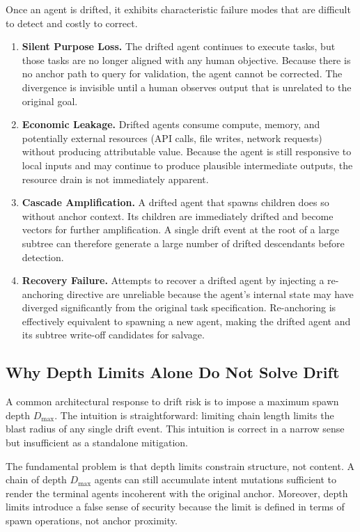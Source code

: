 Once an agent is drifted, it exhibits characteristic failure modes that are difficult to detect and costly to correct.

\begin{enumerate}
    \item \textbf{Silent Purpose Loss.} The drifted agent continues to execute tasks, but those tasks are no longer aligned with any human objective. Because there is no anchor path to query for validation, the agent cannot be corrected. The divergence is invisible until a human observes output that is unrelated to the original goal.
    
    \item \textbf{Economic Leakage.} Drifted agents consume compute, memory, and potentially external resources (API calls, file writes, network requests) without producing attributable value. Because the agent is still responsive to local inputs and may continue to produce plausible intermediate outputs, the resource drain is not immediately apparent.
    
    \item \textbf{Cascade Amplification.} A drifted agent that spawns children does so without anchor context. Its children are immediately drifted and become vectors for further amplification. A single drift event at the root of a large subtree can therefore generate a large number of drifted descendants before detection.
    
    \item \textbf{Recovery Failure.} Attempts to recover a drifted agent by injecting a re-anchoring directive are unreliable because the agent's internal state may have diverged significantly from the original task specification. Re-anchoring is effectively equivalent to spawning a new agent, making the drifted agent and its subtree write-off candidates for salvage.
\end{enumerate}

\subsection{Why Depth Limits Alone Do Not Solve Drift}

A common architectural response to drift risk is to impose a maximum spawn depth $D_{\max}$. The intuition is straightforward: limiting chain length limits the blast radius of any single drift event. This intuition is correct in a narrow sense but insufficient as a standalone mitigation.

The fundamental problem is that depth limits constrain structure, not content. A chain of depth $D_{\max}$ agents can still accumulate intent mutations sufficient to render the terminal agents incoherent with the original anchor. Moreover, depth limits introduce a false sense of security because the limit is defined in terms of spawn operations, not anchor proximity.

